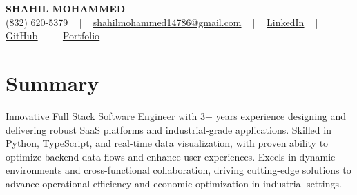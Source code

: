 \documentclass[letterpaper,10pt]{article}
\begin{document}
\begin{center}
    {\fontsize{14pt}{12pt}\selectfont \textbf{\MakeUppercase{Shahil Mohammed}}}\\ \vspace{2pt}
    \fontsize{10pt}{12pt}\selectfont (832) 620-5379 ~ | ~ \href{mailto:shahilmohammed14786@gmail.com}{shahilmohammed14786@gmail.com} ~ | ~  
    \href{https://www.linkedin.com/in/shahil-mohammed-9652931a1/}{\color{blue}\underline{LinkedIn}}  ~ | ~ 
    \href{https://github.com/freakbeast14}{\color{blue}\underline{GitHub}} ~ | ~ 
    \href{https://shahil-mohammed.netlify.app/}{\color{blue}\underline{Portfolio}}
    \vspace{-8pt}
\end{center}

\section{Summary}
\vspace{-2pt}\fontsize{8pt}{9pt}\selectfont
Innovative Full Stack Software Engineer with 3+ years experience designing and delivering robust SaaS platforms and industrial-grade applications. Skilled in Python, TypeScript, and real-time data visualization, with proven ability to optimize backend data flows and enhance user experiences. Excels in dynamic environments and cross-functional collaboration, driving cutting-edge solutions to advance operational efficiency and economic optimization in industrial settings.
 \vspace{-5pt}
 
\vspace{-2pt}
\end{document}

